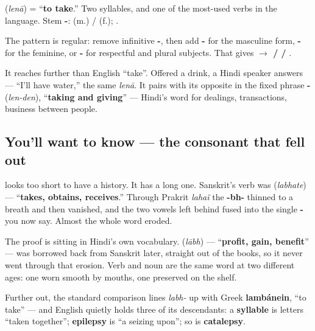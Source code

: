 \begin{cousinweb}
\textbf{} (\emph{lenā}) = \textquotedblleft{}\textbf{to take}.\textquotedblright{} Two syllables, and one of the most-used verbs in the language. Stem \textbf{-}: \textbf{  } (m.) / \textbf{  } (f.); \textbf{  }.

The pattern is regular: remove infinitive \textbf{-}, then add \textbf{-} for the masculine form, \textbf{-} for the feminine, or \textbf{-} for respectful \textbf{} and plural subjects. That gives \textbf{ $\to$  /  / }.

It reaches further than English \textquotedblleft{}take\textquotedblright{}. Offered a drink, a Hindi speaker answers \textbf{   } — \textquotedblleft{}I'll have water,\textquotedblright{} the same \emph{lenā}. It pairs with its opposite in the fixed phrase \textbf{-} (\emph{len-den}), \textquotedblleft{}\textbf{taking and giving}\textquotedblright{} — Hindi's word for dealings, transactions, business between people.
\end{cousinweb}

\subsection*{You'll want to know — the consonant that fell out}
\textbf{} looks too short to have a history. It has a long one. Sanskrit's verb was \textbf{} (\emph{labhate}) — \textquotedblleft{}\textbf{takes, obtains, receives}.\textquotedblright{} Through Prakrit \emph{lahaï} the \textbf{-bh-} thinned to a breath and then vanished, and the two vowels left behind fused into the single \textbf{-} you now say. Almost the whole word eroded.

The proof is sitting in Hindi's own vocabulary. \textbf{} (\emph{lābh}) — \textquotedblleft{}\textbf{profit, gain, benefit}\textquotedblright{} — was borrowed back from Sanskrit later, straight out of the books, so it never went through that erosion. Verb and noun are the same word at two different ages: one worn smooth by mouths, one preserved on the shelf.

Further out, the standard comparison lines \emph{labh-} up with Greek \textbf{lambánein}, \textquotedblleft{}to take\textquotedblright{} — and English quietly holds three of its descendants: a \textbf{syllable} is letters \textquotedblleft{}taken together\textquotedblright{}; \textbf{epilepsy} is \textquotedblleft{}a seizing upon\textquotedblright{}; so is \textbf{catalepsy}.

